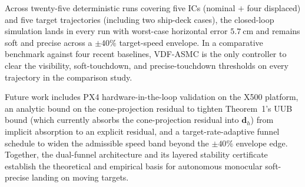 \documentclass{IEEEtaes}
\begin{document}
Across twenty-five deterministic runs covering five ICs (nominal $+$ four displaced) and five target trajectories (including two ship-deck cases), the closed-loop simulation lands in every run with worst-case horizontal error $5.7~\text{cm}$ and remains soft and precise across a $\pm 40\%$ target-speed envelope. In a comparative benchmark against four recent baselines, VDF-ASMC is the only controller to clear the visibility, soft-touchdown, and precise-touchdown thresholds on every trajectory in the comparison study.

Future work includes PX4 hardware-in-the-loop validation on the X500 platform, an analytic bound on the cone-projection residual to tighten Theorem~1's UUB bound (which currently absorbs the cone-projection residual into $\boldsymbol{d}_h$) from implicit absorption to an explicit residual, and a target-rate-adaptive funnel schedule to widen the admissible speed band beyond the $\pm 40\%$ envelope edge. Together, the dual-funnel architecture and its layered stability certificate establish the theoretical and empirical basis for autonomous monocular soft-precise landing on moving targets.






\end{document}

